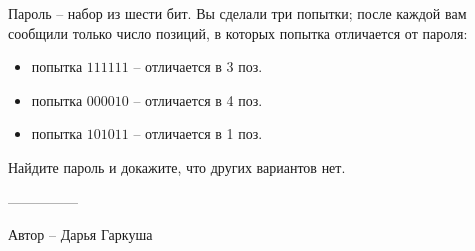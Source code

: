 \question
Пароль -- набор из шести бит. Вы сделали три попытки; после каждой вам сообщили только число позиций, в которых попытка отличается от пароля:
\begin{itemize}
    \item попытка $111111$ -- отличается в 3 поз.
    \item попытка $000010$ -- отличается в 4 поз.
    \item попытка $101011$ -- отличается в 1 поз.
\end{itemize}
Найдите пароль и докажите, что других вариантов нет.

---------------

Автор -- Дарья Гаркуша